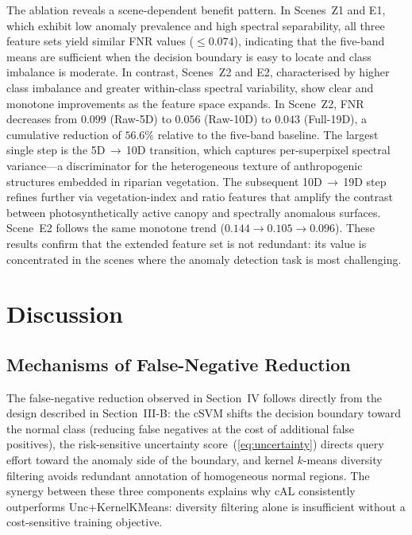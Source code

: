 \documentclass[lettersize,journal]{IEEEtran}
\begin{document}
The ablation reveals a scene-dependent benefit pattern. In Scenes~Z1 and E1,
which exhibit low anomaly prevalence and high spectral separability, all three
feature sets yield similar FNR values ($\leq\!0.074$), indicating that the
five-band means are sufficient when the decision boundary is easy to locate
and class imbalance is moderate. In contrast, Scenes~Z2 and E2, characterised
by higher class imbalance and greater within-class spectral variability, show
clear and monotone improvements as the feature space expands. In Scene~Z2,
FNR decreases from $0.099$ (Raw-5D) to $0.056$ (Raw-10D) to $\mathbf{0.043}$
(Full-19D), a cumulative reduction of $56.6\%$ relative to the five-band
baseline. The largest single step is the 5D\,$\to$\,10D transition, which
captures per-superpixel spectral variance---a discriminator for the
heterogeneous texture of anthropogenic structures embedded in riparian
vegetation. The subsequent 10D\,$\to$\,19D step refines further via
vegetation-index and ratio features that amplify the contrast between
photosynthetically active canopy and spectrally anomalous surfaces.
Scene~E2 follows the same monotone trend ($0.144 \to 0.105 \to 0.096$).
These results confirm that the extended feature set is not redundant:
its value is concentrated in the scenes where the anomaly detection task
is most challenging.

\clearpage
\section{Discussion}

\subsection{Mechanisms of False-Negative Reduction}

The false-negative reduction observed in Section~IV follows directly
from the design described in Section~III-B: the cSVM shifts the
decision boundary toward the normal class (reducing false negatives
at the cost of additional false positives), the risk-sensitive
uncertainty score~(\ref{eq:uncertainty}) directs query effort toward
the anomaly side of the boundary, and kernel $k$-means diversity
filtering avoids redundant annotation of homogeneous normal regions.
The synergy between these three components explains why cAL
consistently outperforms Unc+KernelKMeans: diversity filtering alone
is insufficient without a cost-sensitive training objective.
\end{document}
